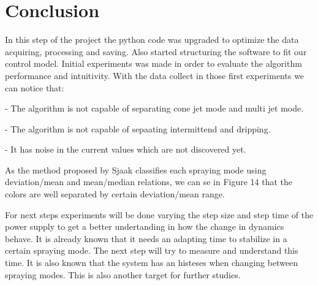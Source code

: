 \section{Conclusion}

In this step of the project the python code was upgraded to optimize the data acquiring, processing and saving. Also 
started structuring the software to fit our control model. Initial experiments was made in order to evaluate the algorithm 
performance and intuitivity. With the data collect in those first experiments we can notice that:

- The algorithm is not capable of separating cone jet mode and multi jet mode.

- The algorithm is not capable of sepaating intermittend and dripping.

- It has noise in the current values which are not discovered yet.

As the method proposed by Sjaak\cite*[]{Sjaaks} classifies each spraying mode using deviation/mean and mean/median relations,
we can se in Figure 14 that the colors are well separated by certain deviation/mean range.

For next steps experiments will be done varying the step size and step time of the power supply to get a better undertanding in how
the change in dynamics behave. It is already known that it needs an adapting time to stabilize in a certain spraying mode. The next step
will try to measure and understand this time. It is also known that the system has an histeses when changing between spraying modes. This is also
another target for further studies.


